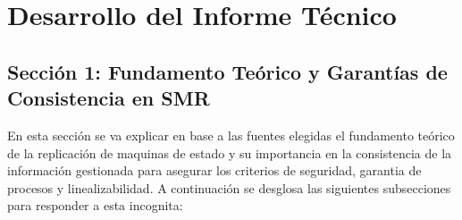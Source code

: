 \documentclass[12pt,letterpaper]{article}
\begin{document}
\section{Desarrollo del Informe Técnico}
\label{sec:informe_tecnico}

\subsection{Sección 1: Fundamento Teórico y Garantías de Consistencia en SMR }
\label{subsec:q1_desarrollo}

En esta sección se va explicar en base a las fuentes elegidas el fundamento teórico de la replicación de maquinas de estado y su importancia en la consistencia de la información gestionada para asegurar los criterios de seguridad, garantia de procesos y linealizabilidad. A continuación se desglosa las siguientes subsecciones para responder a esta incognita:
\end{document}
